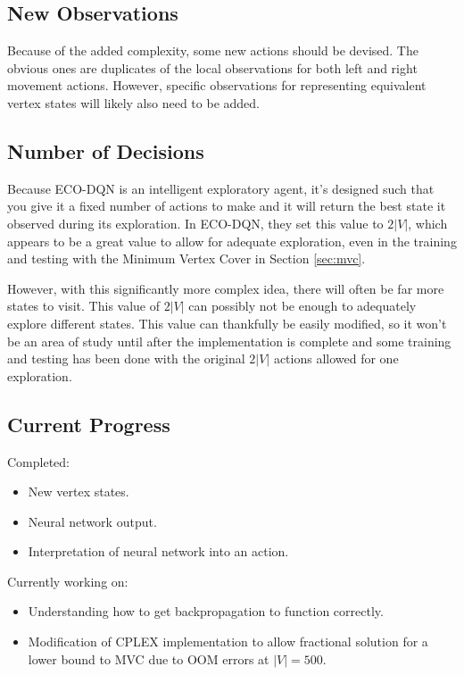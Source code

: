 \documentclass{article}
\begin{document}
\subsection{New Observations}

Because of the added complexity, some new actions should be devised. The obvious ones are duplicates of the local observations for both left and right movement actions. However, specific observations for representing equivalent vertex states will likely also need to be added.

\subsection{Number of Decisions}

Because ECO-DQN is an intelligent exploratory agent, it's designed such that you give it a fixed number of actions to make and it will return the best state it observed during its exploration. In ECO-DQN, they set this value to $2 |V|$, which appears to be a great value to allow for adequate exploration, even in the training and testing with the Minimum Vertex Cover in Section \ref{sec:mvc}.

However, with this significantly more complex idea, there will often be far more states to visit. This value of $2 |V|$ can possibly not be enough to adequately explore different states. This value can thankfully be easily modified, so it won't be an area of study until after the implementation is complete and some training and testing has been done with the original $2 |V|$ actions allowed for one exploration.

\subsection{Current Progress}

Completed:

\begin{itemize}
    \item New vertex states.
    \item Neural network output.
    \item Interpretation of neural network into an action.
\end{itemize}

Currently working on:

\begin{itemize}
    \item Understanding how to get backpropagation to function correctly.
    \item Modification of CPLEX implementation to allow fractional solution for a lower bound to MVC due to OOM errors at $|V| = 500$.
\end{itemize}
\end{document}
